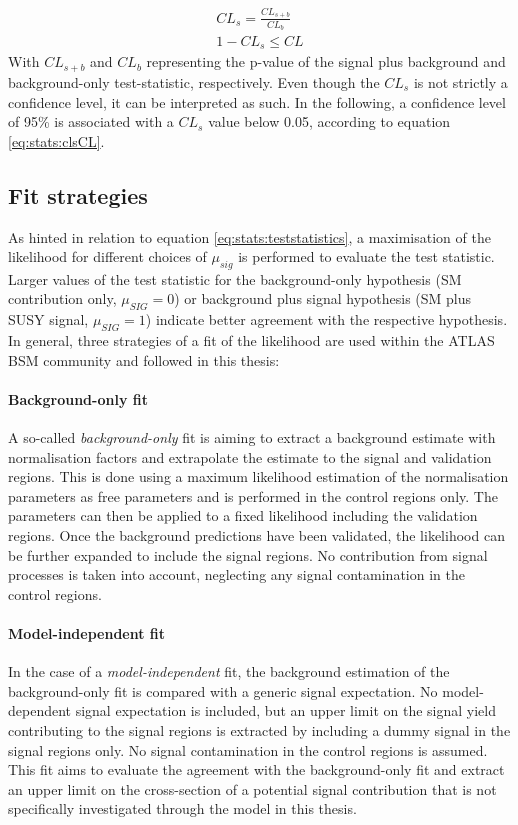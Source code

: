 \begin{align}
CL_s = \frac{CL_{s+b }}{CL_b}  \label{eq:stats:cls} \\
1 - CL_s \leq CL  \label{eq:stats:clsCL}
\end{align}
With $CL_{s+b}$ and $CL_b$ representing the p-value of the signal plus background and background-only test-statistic, respectively. 
Even though the $CL_s$ is not strictly a confidence level,  it can be interpreted as such.  In the following,  a confidence level of 95\% is associated with a $CL_s$ value below 0.05, according to equation \eqref{eq:stats:clsCL}.

\subsection{Fit strategies}
As hinted in relation to equation \eqref{eq:stats:teststatistics},  a maximisation of the likelihood for different choices of $\mu_{sig}$ is performed to evaluate the test statistic.  Larger values of the test statistic for the background-only hypothesis (\ac{SM} contribution only, $\mu_{SIG}=0$) or background plus signal hypothesis (\ac{SM} plus \ac{SUSY} signal, $\mu_{SIG}=1$) indicate better agreement with the respective hypothesis.  In general,  three strategies of a fit of the likelihood are used within the \ac{ATLAS} \ac{BSM} community and followed in this thesis:
\paragraph{Background-only fit}
A so-called \textit{background-only} fit is aiming to extract a background estimate with normalisation factors and extrapolate the estimate to the signal and validation regions.  This is done using a maximum likelihood estimation \cite{Cowan} of the normalisation parameters as free parameters and is performed in the control regions only.  The parameters can then be applied to a fixed likelihood including the validation regions.  Once the background predictions have been validated,  the likelihood can be further expanded to include the signal regions. No contribution from signal processes is taken into account,  neglecting any signal contamination in the control regions.  
\paragraph{Model-independent fit}
In the case of a \textit{model-independent} fit,  the background estimation of the background-only fit is compared with a generic signal expectation.  No model-dependent signal expectation is included, but an upper limit on the signal yield contributing to the signal regions is extracted by including a dummy signal in the signal regions only.  No signal contamination in the control regions is assumed.  This fit aims to evaluate the agreement with the background-only fit and extract an upper limit on the cross-section of a potential signal contribution that is not specifically investigated through the model in this thesis. 

